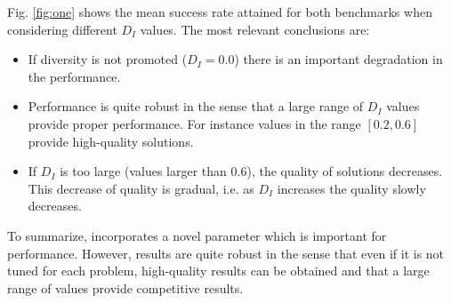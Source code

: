 Fig. \ref{fig:one} shows the mean success rate attained for both benchmarks when considering different $D_I$ values.
%
The most relevant conclusions are:
\begin{itemize}
\item If diversity is not promoted ($D_I = 0.0 $) there is an important degradation in the performance. 
\item Performance is quite robust in the sense that a large range of $D_I$ values provide proper performance. For instance values
in the range $[0.2, 0.6]$ provide high-quality solutions.
\item If $D_I$ is too large (values larger than $0.6$), the quality of solutions decreases. This decrease of quality is gradual, i.e. as $D_I$ increases the quality slowly decreases.
\end{itemize}

To summarize, \DEEDM{} incorporates a novel parameter which is important for performance.
%
However, results are quite robust in the sense that even if it is not tuned for each problem, high-quality results can be obtained and that
a large range of values provide competitive results.

